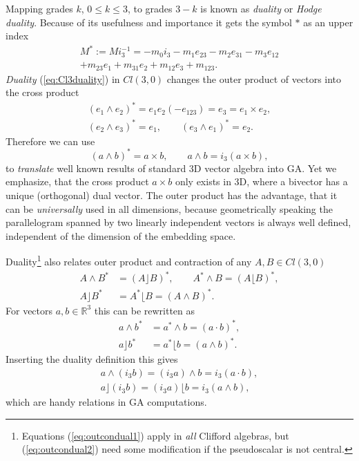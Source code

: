 \documentclass[cameraready]{jcmsi}%
\newcommand{\R}{\mathbb{R}}
\newcommand{\be}{\begin{equation}}
\newcommand{\ee}{\end{equation}}
\begin{document}
Mapping grades $k$, $0 \leq k \leq 3$, to grades $3-k$ is known as \textit{duality} or \textit{Hodge duality}. Because of its usefulness and importance it gets the symbol $*$ as an upper index
\begin{gather}
  M^* := M i_3^{-1} = -m_0i_3 - m_1 e_{23} - m_2 e_{31} - m_3 e_{12} 
  \nonumber \\
  + m_{23} e_{1} + m_{31} e_{2}+ m_{12} e_{3} + m_{123}.
  \label{eq:Cl3duality}
\end{gather}
\textit{Duality} (\ref{eq:Cl3duality}) in $Cl(3,0)$ changes the outer product of vectors into the cross product
\begin{gather} 
  (e_1\wedge e_2)^* = e_1e_2 (-e_{123})= e_3 = e_1 \times e_2 , 
  \nonumber \\
  (e_2\wedge e_3)^* = e_1, \qquad 
  (e_3\wedge e_1)^* = e_2.
\end{gather}
Therefore we can use
\be 
  (a \wedge b)^* = a \times b, \qquad a \wedge b = i_3 (a \times b),
\ee 
to \textit{translate} well known results of standard 3D vector algebra into GA. Yet we emphasize, that the cross product $a \times b$ only exists in 3D, where a bivector has a unique (orthogonal) dual vector. The outer product has the advantage, that it can be \textit{universally} used in all dimensions, because geometrically speaking the parallelogram spanned by two linearly independent vectors is always well defined, independent of the dimension of the embedding space. 
 
Duality\footnote{
  Equations (\ref{eq:outcondual1})
apply in \textit{all} Clifford algebras, but (\ref{eq:outcondual2}) need some modification if the pseudoscalar is not central.} also relates outer product and contraction of any $A,B \in Cl(3,0)$
\begin{align}  
  A \wedge B^* &= (A\rfloor B)^*, \qquad
  A^* \wedge B = (A\lfloor B)^*,
  \label{eq:outcondual1}
  \\
  A \rfloor B^* &= 
  A^* \lfloor B = (A\wedge B)^*.
  \label{eq:outcondual2}
\end{align}
For vectors $a,b \in \R^3$ this can be rewritten as
\begin{align} 
  a \wedge b^* &= a^* \wedge b = (a \cdot b)^* , 
  \nonumber \\
  a \rfloor b^* &= a^* \lfloor b = (a \wedge b)^* .
\end{align}
Inserting the duality definition this gives
\begin{align} 
  a \wedge (i_3b) = (i_3a)\wedge b = i_3(a \cdot b),
  \nonumber \\
  a \rfloor (i_3b) = (i_3a) \lfloor b = i_3(a \wedge b),
\end{align}
which are handy relations in GA computations. 
\end{document}
